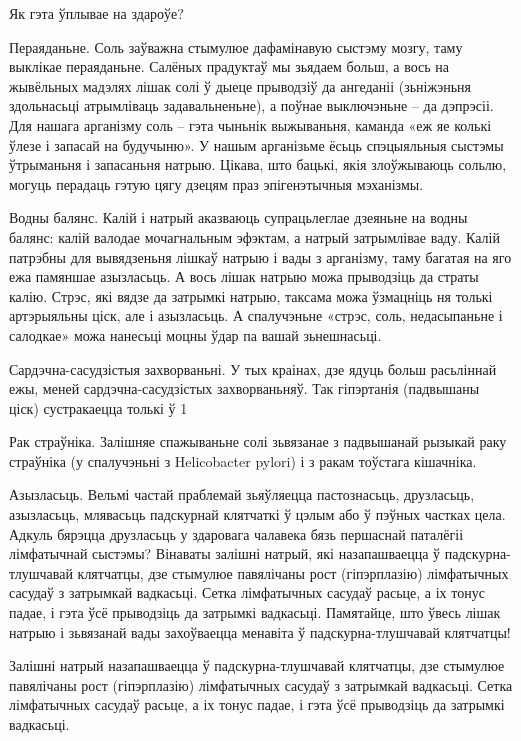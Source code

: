 Як гэта ўплывае на здароўе?

Пераяданьне.
Соль заўважна стымулюе дафамінавую сыстэму мозгу, таму выклікае пераяданьне. Салёных прадуктаў мы зьядаем больш, а вось на жывёльных мадэлях лішак солі ў дыеце прыводзіў да ангеданіі (зьніжэньня здольнасьці атрымліваць задавальненьне), а поўнае выключэньне – да дэпрэсіі. Для нашага арганізму соль – гэта чыньнік выжываньня, каманда «еж яе колькі ўлезе і запасай на будучыню». У нашым арганізьме ёсьць спэцыяльныя сыстэмы ўтрыманьня і запасаньня натрыю. Цікава, што бацькі, якія злоўжываюць сольлю, могуць перадаць гэтую цягу дзецям праз эпігенэтычныя мэханізмы.

Водны балянс.
Калій і натрый аказваюць супрацьлеглае дзеяньне на водны балянс: калій валодае мочагнальным эфэктам, а натрый затрымлівае ваду. Калій патрэбны для вывядзеньня лішкаў натрыю і вады з арганізму, таму багатая на яго ежа памяншае азызласьць. А вось лішак натрыю можа прыводзіць да страты калію. Стрэс, які вядзе да затрымкі натрыю, таксама можа ўзмацніць ня толькі артэрыяльны ціск, але і азызласьць. А спалучэньне «стрэс, соль, недасыпаньне і салодкае» можа нанесьці моцны ўдар па вашай зьнешнасьці.

Сардэчна-сасудзістыя захворваньні.
У тых краінах, дзе ядуць больш расьліннай ежы, меней сардэчна-сасудзістых захворваньняў. Так гіпэртанія (падвышаны ціск) сустракаецца толькі ў 1%

Рак страўніка.
Залішняе спажываньне солі зьвязанае з падвышанай рызыкай раку страўніка (у спалучэньні з Helicobacter pylori) і з ракам тоўстага кішачніка.

Азызласьць.
Вельмі частай праблемай зьяўляецца пастознасьць, друзласьць, азызласьць, млявасьць падскурнай клятчаткі ў цэлым або ў пэўных частках цела. Адкуль бярэцца друзласьць у здаровага чалавека бязь першаснай паталёгіі лімфатычнай сыстэмы? Вінаваты залішні натрый, які назапашваецца ў падскурна-тлушчавай клятчатцы, дзе стымулюе павялічаны рост (гіпэрплазію) лімфатычных сасудаў з затрымкай вадкасьці. Сетка лімфатычных сасудаў расьце, а іх тонус падае, і гэта ўсё прыводзіць да затрымкі вадкасьці. Памятайце, што ўвесь лішак натрыю і зьвязанай вады захоўваецца менавіта ў падскурна-тлушчавай клятчатцы!

Залішні натрый назапашваецца ў падскурна-тлушчавай клятчатцы, дзе стымулюе павялічаны рост (гіпэрплазію) лімфатычных сасудаў з затрымкай вадкасьці. Сетка лімфатычных сасудаў расьце, а іх тонус падае, і гэта ўсё прыводзіць да затрымкі вадкасьці.

